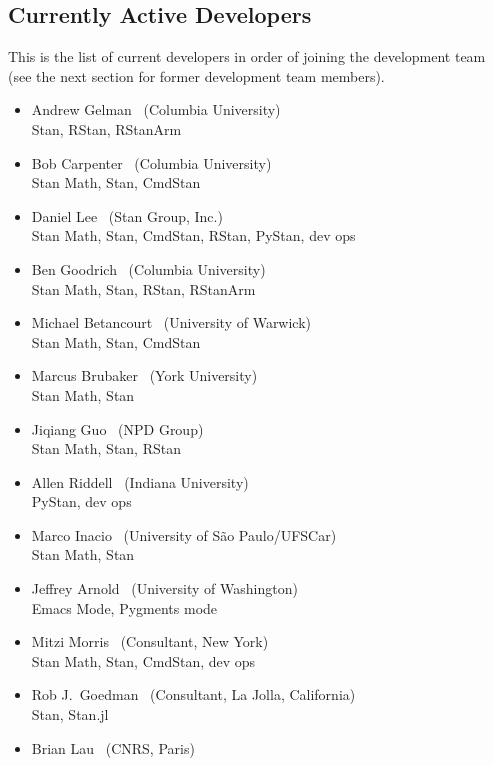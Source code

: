\subsection*{Currently Active Developers}

This is the list of current developers in order of joining the
development team (see the next section for former development team
members).

\begin{itemize}
\item Andrew Gelman \ (Columbia University)
\\ {\footnotesize Stan, RStan, RStanArm}
\item Bob Carpenter \ (Columbia University) \\ {\footnotesize Stan
    Math, Stan, CmdStan}
\item Daniel Lee \   (Stan Group, Inc.)
\\ {\footnotesize Stan Math, Stan, CmdStan, RStan, PyStan, dev ops}
\item Ben Goodrich \   (Columbia University)
\\ {\footnotesize Stan Math, Stan, RStan, RStanArm}
\item Michael Betancourt \ (University of Warwick) \\
  {\footnotesize Stan Math, Stan, CmdStan}
\item Marcus Brubaker \   (York University)
\\ {\footnotesize Stan Math, Stan}
\item Jiqiang Guo \   (NPD Group)
\\ {\footnotesize Stan Math, Stan, RStan}
\item Allen Riddell \   (Indiana University)
\\ {\footnotesize PyStan, dev ops}
\item Marco Inacio \   (University of S\~{a}o Paulo/UFSCar)
\\ {\footnotesize Stan Math, Stan}
\item Jeffrey Arnold \   (University of Washington)
\\ {\footnotesize Emacs Mode, Pygments mode}
\item Mitzi Morris \   (Consultant, New York)
\\ {\footnotesize Stan Math, Stan, CmdStan, dev ops}
\item Rob J.\ Goedman \ (Consultant, La Jolla, California)
\\ {\footnotesize Stan, Stan.jl}
\item Brian Lau \ (CNRS, Paris)

\end{itemize}
